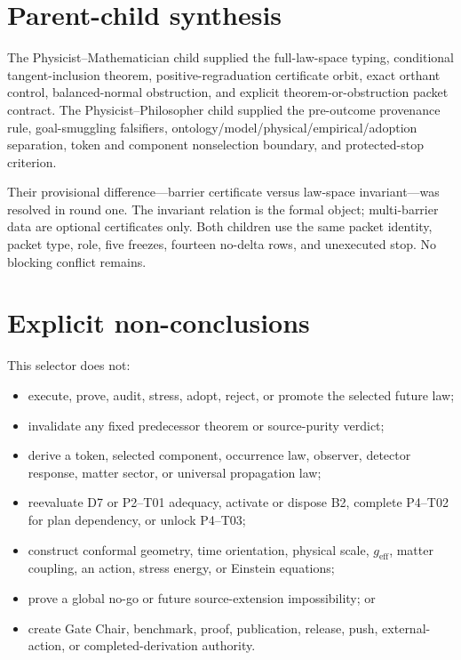 \documentclass[11pt]{article}
\begin{document}
\section{Parent-child synthesis}

The Physicist--Mathematician child supplied the full-law-space typing,
conditional tangent-inclusion theorem, positive-regraduation certificate
orbit, exact orthant control, balanced-normal obstruction, and explicit
theorem-or-obstruction packet contract.  The Physicist--Philosopher child
supplied the pre-outcome provenance rule, goal-smuggling falsifiers,
ontology/model/physical/empirical/adoption separation, token and component
nonselection boundary, and protected-stop criterion.

Their provisional difference---barrier certificate versus law-space
invariant---was resolved in round one.  The invariant relation is the formal
object; multi-barrier data are optional certificates only.  Both children use
the same packet identity, packet type, role, five freezes, fourteen no-delta
rows, and unexecuted stop.  No blocking conflict remains.

\section{Explicit non-conclusions}

This selector does not:
\begin{itemize}
  \item execute, prove, audit, stress, adopt, reject, or promote the selected
  future law;
  \item invalidate any fixed predecessor theorem or source-purity verdict;
  \item derive a token, selected component, occurrence law, observer, detector
  response, matter sector, or universal propagation law;
  \item reevaluate D7 or P2--T01 adequacy, activate or dispose B2, complete
  P4--T02 for plan dependency, or unlock P4--T03;
  \item construct conformal geometry, time orientation, physical scale,
  \(g_{\mathrm{eff}}\), matter coupling, an action, stress energy, or Einstein
  equations;
  \item prove a global no-go or future source-extension impossibility; or
  \item create Gate Chair, benchmark, proof, publication, release, push,
  external-action, or completed-derivation authority.
\end{itemize}
\end{document}
